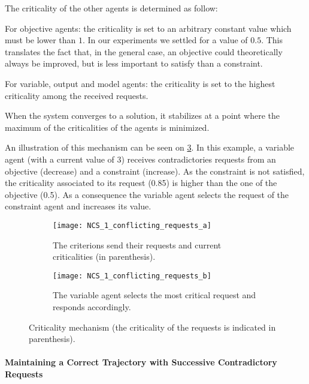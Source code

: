 \noindent The criticality of the other agents is determined as follow:

\begin{compactitem}
\item For objective agents: the criticality is set to an arbitrary constant value which must be lower than \(1\). In our experiments we settled for a value of \(0.5\). This translates the fact that, in the general case, an objective could theoretically always be improved, but is less important to satisfy than a constraint.
\item For variable, output and model agents: the criticality is set to the highest criticality among the received requests.
\end{compactitem}

When the system converges to a solution, it stabilizes at a point where the maximum of the criticalities of the agents is minimized.

An illustration of this mechanism can be seen on \figurename{} \ref{NCS_1_conflicting_requests}. In this example, a variable agent (with a current value of 3) receives contradictories requests from an objective (decrease) and a constraint (increase). As the constraint is not satisfied, the criticality associated to its request (0.85) is higher than the one of the objective (0.5). As a consequence the variable agent selects the request of the constraint agent and increases its value.

\begin{figure}
	\centering
	\begin{subfigure}[b]{0.45\textwidth}
		\centering
		\texttt{[image: NCS\_1\_conflicting\_requests\_a]}
		\caption{The criterions send their requests and current criticalities (in parenthesis).}\label{NCS_1_conflicting_requests_a}
	\end{subfigure}
	\hfill
	\begin{subfigure}[b]{0.45\textwidth}
		\centering
		\texttt{[image: NCS\_1\_conflicting\_requests\_b]}
		\caption{The variable agent selects the most critical request and responds accordingly.}\label{NCS_1_conflicting_requests_b}
	\end{subfigure}
	
\caption{Criticality mechanism (the criticality of the requests is indicated in parenthesis).}\label{NCS_1_conflicting_requests}
\end{figure}

\paragraph*{Maintaining a Correct Trajectory with Successive Contradictory Requests}


